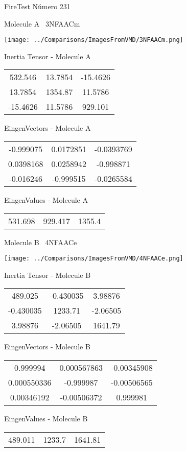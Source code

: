 \vtab[-3cm]
\begin{center}
{\large FireTest \tab Número 231}
\end{center}
\begin{multicols}{2}
\begin{center}

Molecule A \
3NFAACm

\texttt{[image: ../Comparisons/ImagesFromVMD/3NFAACm.png]}

Inertia Tensor - Molecule A \\
\begin{tabular}{|c c c|}
532.546	 & 	13.7854	 & 	-15.4626	 \\
13.7854	 & 	1354.87	 & 	11.5786	 \\
-15.4626	 & 	11.5786	 & 	929.101
\end{tabular}

\vtab
 EingenVectors - Molecule A     \\
\begin{tabular}{|c c c|}
-0.999075	 & 	0.0172851	 & 	-0.0393769	 \\
0.0398168	 & 	0.0258942	 & 	-0.998871	 \\
-0.016246	 & 	-0.999515	 & 	-0.0265584
\end{tabular}

\vtab
 EingenValues - Molecule A     \\
\begin{tabular}{|c c c|}
531.698	 & 	929.417	 & 	1355.4	 \\
\end{tabular}
\columnbreak

Molecule B \
4NFAACe

\texttt{[image: ../Comparisons/ImagesFromVMD/4NFAACe.png]}

Inertia Tensor - Molecule B \\
\begin{tabular}{|c c c|}
489.025	 & 	-0.430035	 & 	3.98876	 \\
-0.430035	 & 	1233.71	 & 	-2.06505	 \\
3.98876	 & 	-2.06505	 & 	1641.79
\end{tabular}

\vtab
 EingenVectors - Molecule B     \\
\begin{tabular}{|c c c|}
0.999994	 & 	0.000567863	 & 	-0.00345908	 \\
0.000550336	 & 	-0.999987	 & 	-0.00506565	 \\
0.00346192	 & 	-0.00506372	 & 	0.999981
\end{tabular}

\vtab
 EingenValues - Molecule B     \\
\begin{tabular}{|c c c|}
489.011	 & 	1233.7	 & 	1641.81	 \\
\end{tabular}

\end{center}
\end{multicols}

